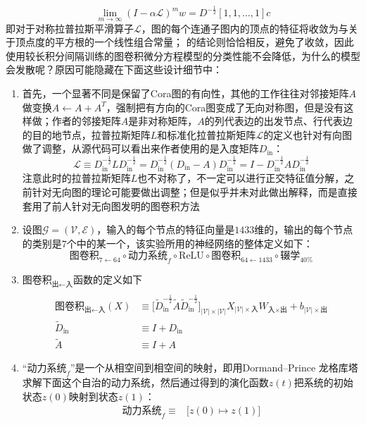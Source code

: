 \documentclass[11pt]{article}
\begin{document}
\begin{enumerate}
\[\lim_{m\to\infty}(I-\alpha\mathcal{L})^mw=D^{-\frac{1}{2}}[1,1,\dots,1]c
\]即对于对称拉普拉斯平滑算子$\mathcal{L}$，图的每个连通子图内的顶点的特征将收敛为与关于顶点度的平方根的一个线性组合常量；\cite{poli2019graph} 的结论则恰恰相反，避免了收敛，因此使用较长积分间隔训练的图卷积微分方程模型的分类性能不会降低，为什么\cite{poli2019graph}的模型会发散呢？原因可能隐藏在下面这些设计细节中：
\begin{enumerate}
\item 首先，\cite{poli2019graph}一个显著不同是保留了Cora图的有向性，其他的工作往往对邻接矩阵$A$做变换$A\leftarrow A+A^T$，强制把有方向的Cora图变成了无向对称图，但是\cite{poli2019graph}没有这样做；作者的邻接矩阵$A$是非对称矩阵，$A$的列代表边的出发节点、行代表边的目的地节点，拉普拉斯矩阵$L$和标准化拉普拉斯矩阵$\mathcal{L}$的定义也针对有向图做了调整，从源代码可以看出来作者使用的是入度矩阵$D_\text{in}$：\[
\mathcal{L}\equiv D_\text{in}^{-{\frac {1}{2}}}LD_\text{in}^{-{\frac {1}{2}}}=D_\text{in}^{-{\frac {1}{2}}}(D_\text{in}-A)D_\text{in}^{-{\frac {1}{2}}}=I-D_\text{in}^{-\frac{1}{2}}AD_\text{in}^{-\frac{1}{2}}
\]注意此时的拉普拉斯矩阵$L$也不对称了，不一定可以进行正交特征值分解，之前针对无向图的理论可能要做出调整；但是\cite{poli2019graph}似乎并未对此做出解释，而是直接套用了前人针对无向图发明的图卷积方法
\item 设图$\mathcal G=(\mathcal V,\mathcal E)$，输入的每个节点的特征向量是$1433$维的，输出的每个节点的类别是$7$个中的某一个，该实验所用的神经网络的整体定义如下：\[
\text{图卷积}_{7\leftarrow64}\circ\text{动力系统}_f\circ\text{ReLU}\circ\text{图卷积}_{64\leftarrow1433}\circ\text{辍学}_{40\%}
\]
\item $\text{图卷积}_{\text{出}\leftarrow\text{入}}$函数的定义如下\[
\begin{split}\\
\text{图卷积}_{\text{出}\leftarrow\text{入}}(X)&\equiv\big[\tilde{D}_\text{in}^{-\frac{1}{2}}\tilde{A}\tilde{D}_\text{in}^{-\frac{1}{2}}\big]_{|\mathcal V|\times|\mathcal V|}X_{|\mathcal V|\times\text{入}}W_{\text{入}\times\text{出}}+b_{|\mathcal V|\times\text{出}}\\
\tilde{D}_\text{in}&\equiv I+D_\text{in}\\
\tilde{A}&\equiv I+A
\end{split}
\]
\item ``$\text{动力系统}_f$''是一个从相空间到相空间的映射，即用Dormand–Prince 龙格库塔求解下面这个自治的动力系统，然后通过得到的演化函数$z(t)$把系统的初始状态$z(0)$映射到状态$z(1)$：\[
\begin{split}
\text{动力系统}_f\equiv&\big[z(0)\mapsto z(1)\big]\\

\end{split}\]
\end{enumerate}
\end{enumerate}
\end{document}
